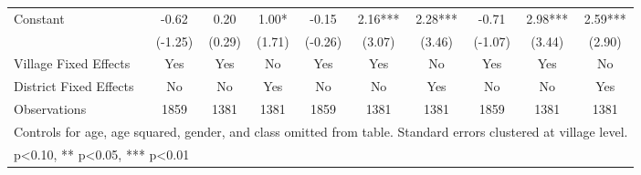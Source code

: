 \begin{sidewaystable}[htbp]
\begin{tabular}{l*{9}{c}}
Constant        &    -0.62   &     0.20   &     1.00*  &    -0.15   &     2.16***&     2.28***&    -0.71   &     2.98***&     2.59***\\
                &  (-1.25)   &   (0.29)   &   (1.71)   &  (-0.26)   &   (3.07)   &   (3.46)   &  (-1.07)   &   (3.44)   &   (2.90)   \\
Village Fixed Effects&      Yes   &      Yes   &       No   &      Yes   &      Yes   &       No   &      Yes   &      Yes   &       No   \\
District Fixed Effects&       No   &       No   &      Yes   &       No   &       No   &      Yes   &       No   &       No   &      Yes   \\
\midrule
Observations    &     1859   &     1381   &     1381   &     1859   &     1381   &     1381   &     1859   &     1381   &     1381   \\
\bottomrule
\multicolumn{10}{l}{\footnotesize Controls for age, age squared, gender, and class omitted from table. Standard errors clustered at village level.}\\
\multicolumn{10}{l}{\footnotesize * p<0.10, ** p<0.05, *** p<0.01}\\
\end{tabular}
\end{sidewaystable}
